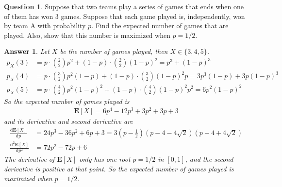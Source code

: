 \documentclass[utf8]{article}
\theoremstyle{definition}%
\newtheorem{question}{Question} %
\theoremstyle{plain}%
\newtheorem{answer}{Answer} %
\begin{document}
\begin{question}
    Suppose that two teams play a series of games that ends when one of them has won 3 games. Suppose that each game played is, independently, won by team A with probability $p$. Find the expected number of games that are played. Also, show that this number is maximized when $p = 1/2$.
\end{question}
\begin{answer}
    Let $X$ be the number of games played, then $X \in \{3, 4, 5\}$.
    \begin{equation}
    \begin{aligned}
        p_{X}(3) &= p \cdot \binom{2}{2} p^2 + (1-p) \cdot \binom{2}{2} (1-p)^2 = p^3 + (1-p)^3 \\
        p_{X}(4) &= p \cdot \binom{3}{2} p^2 (1-p) + (1-p) \cdot \binom{3}{2} (1-p)^2 p = 3p^3(1-p) + 3p(1-p)^3 \\
        p_{X}(5) &= p \cdot \binom{4}{2} p^2 (1-p)^2 + (1-p) \cdot \binom{4}{2} (1-p)^2 p^2 = 6p^2(1-p)^2
    \end{aligned}
    \end{equation}
    So the expected number of games played is
    \begin{align}
        \mathbf{E}[X] = 6p^4 - 12p^3 + 3p^2 + 3p + 3
    \end{align}
    and its derivative and second derivative are
    \begin{equation}
    \begin{aligned}
        \frac{\mathrm{d}\mathbf{E}[X]}{\mathrm{d}p} &= 24p^3 - 36p^2 + 6p + 3 = 3(p-\frac{1}{2})(p-4-4\sqrt{2})(p-4+4\sqrt{2}) \\ 
        \frac{\mathrm{d}^2\mathbf{E}[X]}{\mathrm{d}p^2} &= 72p^2 - 72p + 6
    \end{aligned}        
    \end{equation}
    The derivative of $\mathbf{E}[X]$ only has one root $p = 1/2$ in $[0,1]$, and the second derivative is positive at that point. So the expected number of games played is maximized when $p = 1/2$.
\end{answer}
\end{document}
